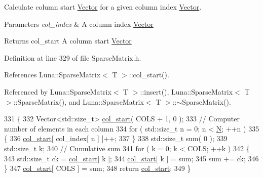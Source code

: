 Calculate column start \hyperlink{classLuna_1_1Vector}{Vector} for a given column index \hyperlink{classLuna_1_1Vector}{Vector}. 


\begin{DoxyParams}{Parameters}
{\em col\+\_\+index} & A column index \hyperlink{classLuna_1_1Vector}{Vector} \\
\hline
\end{DoxyParams}
\begin{DoxyReturn}{Returns}
col\+\_\+start A column start \hyperlink{classLuna_1_1Vector}{Vector} 
\end{DoxyReturn}


Definition at line 329 of file Sparse\+Matrix.\+h.



References Luna\+::\+Sparse\+Matrix$<$ T $>$\+::col\+\_\+start().



Referenced by Luna\+::\+Sparse\+Matrix$<$ T $>$\+::insert(), Luna\+::\+Sparse\+Matrix$<$ T $>$\+::\+Sparse\+Matrix(), and Luna\+::\+Sparse\+Matrix$<$ T $>$\+::$\sim$\+Sparse\+Matrix().


\begin{DoxyCode}
331   \{
332     Vector<std::size\_t> \hyperlink{classLuna_1_1SparseMatrix_a5183843e7b13b0b359a9c98a91b30f6a}{col\_start}( COLS + 1, 0 );
333     \textcolor{comment}{// Computer number of elements in each column}
334     \textcolor{keywordflow}{for} ( std::size\_t n = 0; n < \hyperlink{namespaceHeat__plot_a7d050092798e28458a263710837bda77}{N}; ++n )
335     \{
336       \hyperlink{classLuna_1_1SparseMatrix_a5183843e7b13b0b359a9c98a91b30f6a}{col\_start}[ col\_index[ n ] ]++;
337     \}
338     std::size\_t sum( 0 );
339     std::size\_t k;
340     \textcolor{comment}{// Cumulative sum}
341     \textcolor{keywordflow}{for} ( k = 0; k < COLS; ++k )
342     \{
343       std::size\_t ck = \hyperlink{classLuna_1_1SparseMatrix_a5183843e7b13b0b359a9c98a91b30f6a}{col\_start}[ k ];
344       \hyperlink{classLuna_1_1SparseMatrix_a5183843e7b13b0b359a9c98a91b30f6a}{col\_start}[ k ] = sum;
345       sum += ck;
346     \}
347     \hyperlink{classLuna_1_1SparseMatrix_a5183843e7b13b0b359a9c98a91b30f6a}{col\_start}[ COLS ] = sum;
348     \textcolor{keywordflow}{return} \hyperlink{classLuna_1_1SparseMatrix_a5183843e7b13b0b359a9c98a91b30f6a}{col\_start};
349   \}
\end{DoxyCode}
\mbox{\label{classLuna_1_1SparseMatrix_aff9e25ce05b5d11c3490f37fcd2ccfb0}} 
